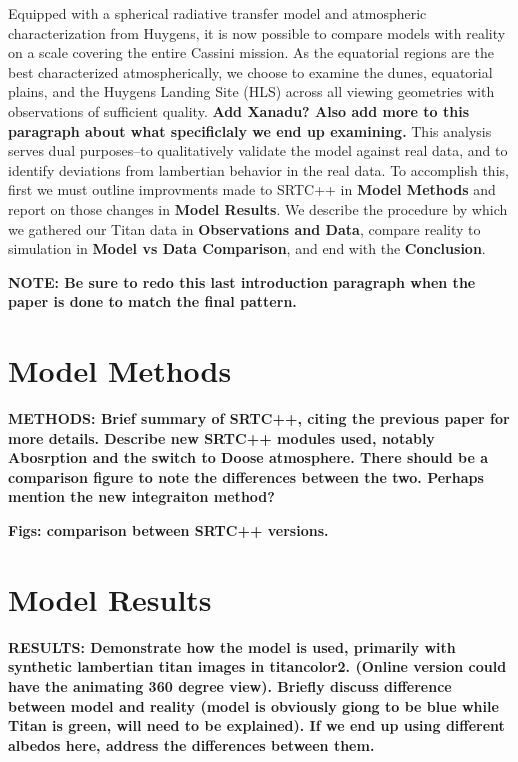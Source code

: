 \documentclass[twocolumn,linenumbers]{aastex631}
\begin{document}
Equipped with a spherical radiative transfer model and atmospheric characterization from Huygens, it is now possible to compare models with reality on a scale covering the entire Cassini mission. As the equatorial regions are the best characterized atmospherically, we choose to examine the dunes, equatorial plains, and the Huygens Landing Site (HLS) across all viewing geometries with observations of sufficient quality. \textbf{\color{red}Add Xanadu? Also add more to this paragraph about what specificlaly we end up examining.\color{black}} This analysis serves dual purposes--to qualitatively validate the model against real data, and to identify deviations from lambertian behavior in the real data. To accomplish this, first we must outline improvments made to SRTC++ in \textbf{Model Methods} and report on those changes in \textbf{Model Results}. We describe the procedure by which we gathered our Titan data in \textbf{Observations and Data}, compare reality to simulation in \textbf{Model vs Data Comparison}, and end with the \textbf{Conclusion}.

\textbf{\color{red}NOTE: Be sure to redo this last introduction paragraph when the paper is done to match the final pattern.\color{black}}

\section{Model Methods} \label{sec:model}

\textbf{\color{blue}METHODS: Brief summary of SRTC++, citing the previous paper for more details. Describe new SRTC++ modules used, notably Abosrption and the switch to Doose atmosphere. There should be a comparison figure to note the differences between the two. Perhaps mention the new integraiton method?\color{black}}

\textbf{\color{blue}Figs: comparison between SRTC++ versions.\color{black}}

\section{Model Results} \label{sec:mresults}

\textbf{\color{blue}RESULTS: Demonstrate how the model is used, primarily with synthetic lambertian titan images in titancolor2. (Online version could have the animating 360 degree view). Briefly discuss difference between model and reality (model is obviously giong to be blue while Titan is green, will need to be explained). If we end up using different albedos here, address the differences between them. \color{black}}
\end{document}
